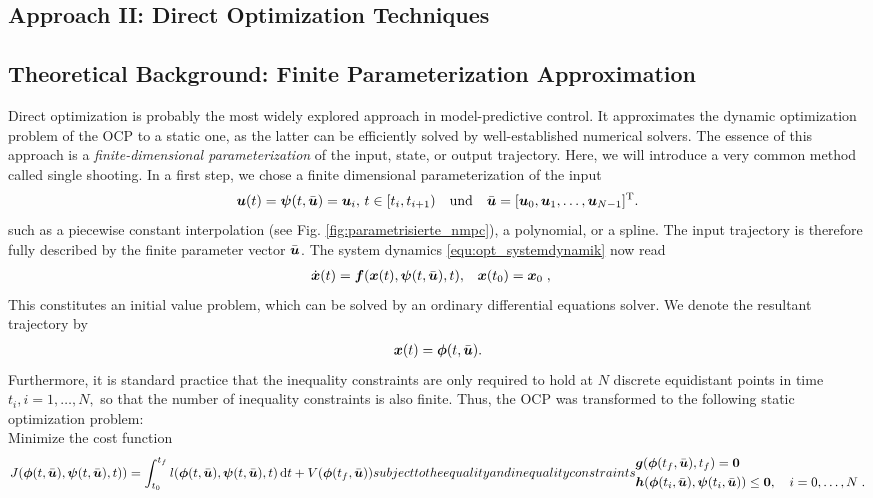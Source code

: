 \subsection{Approach II: Direct Optimization Techniques}\label{S:57.3.2}


\subsection{	Theoretical Background: Finite Parameterization Approximation}\label{S:57.3.2.1}
Direct optimization is probably the most widely explored approach in model-predictive control. It approximates the dynamic optimization problem of the OCP to a static one, as the latter can be efficiently solved by well-established numerical solvers. The essence of this approach is a \textit{finite-dimensional parameterization} of the input, state, or output trajectory.
Here, we will introduce a very common method called single shooting. In a first step, we chose a finite dimensional parameterization of the input
\begin{align*}
	\boldsymbol{u}(t) = \boldsymbol{\psi}(t,\bar{\boldsymbol{u}}) = \boldsymbol{u}_i, \, t\in[t_i, t_{i+1}) \quad \text{und} \quad \bar{\boldsymbol{u}} = [\boldsymbol{u}_0, \boldsymbol{u}_1, \ldots, \boldsymbol{u}_{N-1}]^{{\rm T}}.
\end{align*}
such as a piecewise constant interpolation (see  Fig. \ref{fig:parametrisierte_nmpc}), a polynomial, or a spline. The input trajectory is therefore fully described by the finite parameter vector $\bar{\boldsymbol{u}}$. The system dynamics \eqref{equ:opt_systemdynamik} now read
\begin{align*}
	\dot{\boldsymbol{x}}(t) = \boldsymbol{f}(\boldsymbol{x}(t),\boldsymbol{\psi}(t,\bar{\boldsymbol{u}}),t), \quad &\boldsymbol{x}(t_0) = \boldsymbol{x}_0\; , 
\end{align*}
This constitutes an initial value problem, which can be solved by an ordinary differential equations solver. We denote the resultant trajectory by 
\begin{align*}
\boldsymbol{x}(t) = \boldsymbol{\phi}(t,\bar{\boldsymbol{u}}).
\end{align*}
Furthermore, it is standard practice that the inequality constraints are only required to hold at $N$ discrete equidistant points in time $t_i,i=1,\dots,N,$ so that the number of inequality constraints is also finite. 
Thus, the OCP was transformed to the following static optimization problem:\\
Minimize the cost function
\begin{subequations}
\begin{align}
J(\bs{\phi}(t,\bar{\bs{u}}),\bs{\psi}(t,\bar{\bs{u}}),t)) = 
	\int_{t_0}^{t_f} l(\bs{\phi}(t,\bar{\bs{u}}),\bs{\psi}(t,\bar{\bs{u}}),t)\,{\rm d} t + V(\bs{\phi}(t_f,\bar{\bs{u}}))
\label{equ:diroptcost}
\end{align}
subject to the equality and inequality constraints
\begin{align}
	 &\bs{g}(\bs{\phi}(t_f,\bar{\bs{u}}),t_f) = \bs{0} \label{equ:diropteqcon}\\ 	
	&\bs{h}(\bs{\phi}(t_i,\bar{\bs{u}}),\bs{\psi}(t_i,\bar{\bs{u}}))  \leq \bs{0},  \quad  i=0,\ldots,N \label{equ:diroptineqcon}\;. 
\end{align} 
\end{subequations}

